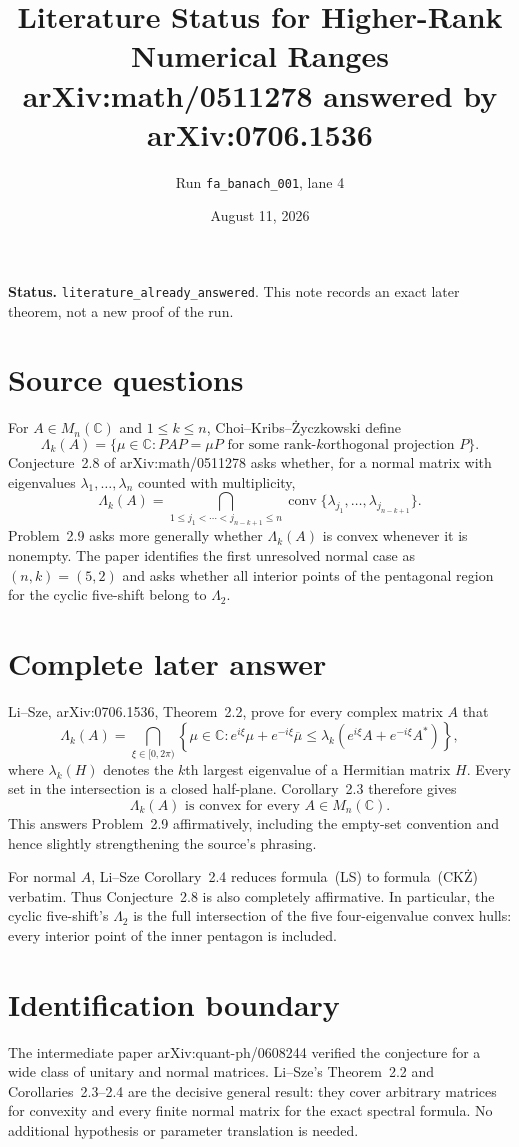 \documentclass[11pt]{article}
\title{Literature Status for Higher-Rank Numerical Ranges\\
\large arXiv:math/0511278 answered by arXiv:0706.1536}
\author{Run \texttt{fa\_banach\_001}, lane 4}
\date{August 11, 2026}
\newcommand{\Lk}{\Lambda_k}
\begin{document}
\maketitle

\textbf{Status.} \texttt{literature\_already\_answered}. This note records
an exact later theorem, not a new proof of the run.

\section*{Source questions}
For $A\in M_n(\mathbb C)$ and $1\leq k\leq n$, Choi--Kribs--Życzkowski
define
\[
 \Lk(A)=\{\mu\in\mathbb C:PAP=\mu P\text{ for some rank-$k$
 orthogonal projection }P\}.
\]
Conjecture~2.8 of arXiv:math/0511278 asks whether, for a normal matrix with
eigenvalues $\lambda_1,\ldots,\lambda_n$ counted with multiplicity,
\[
 \Lk(A)=
 \bigcap_{1\leq j_1<\cdots<j_{n-k+1}\leq n}
 \operatorname{conv}\{\lambda_{j_1},\ldots,\lambda_{j_{n-k+1}}\}.
 \tag{CKŻ}
\]
Problem~2.9 asks more generally whether $\Lk(A)$ is convex whenever it is
nonempty. The paper identifies the first unresolved normal case as
$(n,k)=(5,2)$ and asks whether all interior points of the pentagonal region
for the cyclic five-shift belong to $\Lambda_2$.

\section*{Complete later answer}
Li--Sze, arXiv:0706.1536, Theorem~2.2, prove for every complex matrix $A$
that
\[
 \Lk(A)=\bigcap_{\xi\in[0,2\pi)}
 \left\{\mu\in\mathbb C:
 e^{i\xi}\mu+e^{-i\xi}\overline\mu
 \leq \lambda_k\!\left(e^{i\xi}A+e^{-i\xi}A^*\right)
 \right\},
 \tag{LS}
\]
where $\lambda_k(H)$ denotes the $k$th largest eigenvalue of a Hermitian
matrix $H$. Every set in the intersection is a closed half-plane.
Corollary~2.3 therefore gives
\[
 \boxed{\Lk(A)\text{ is convex for every }A\in M_n(\mathbb C).}
\]
This answers Problem~2.9 affirmatively, including the empty-set convention
and hence slightly strengthening the source's phrasing.

For normal $A$, Li--Sze Corollary~2.4 reduces formula~\textup{(LS)} to
formula~\textup{(CKŻ)} verbatim. Thus Conjecture~2.8 is also completely
affirmative. In particular, the cyclic five-shift's $\Lambda_2$ is the full
intersection of the five four-eigenvalue convex hulls: every interior point
of the inner pentagon is included.

\section*{Identification boundary}
The intermediate paper arXiv:quant-ph/0608244 verified the conjecture for a
wide class of unitary and normal matrices. Li--Sze's Theorem~2.2 and
Corollaries~2.3--2.4 are the decisive general result: they cover arbitrary
matrices for convexity and every finite normal matrix for the exact spectral
formula. No additional hypothesis or parameter translation is needed.
\end{document}

